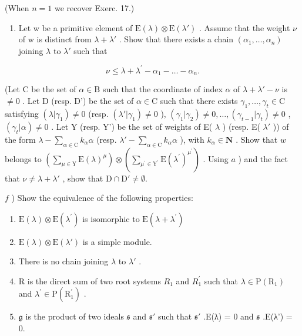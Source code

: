 (When \(n = 1\) we recover Exerc. 17.)

\begin{enumerate}
\def\labelenumi{\alph{enumi})}
\setcounter{enumi}{4}
\tightlist
\item
  Let w be a primitive element of \(\mathrm{E}(\lambda)\otimes\mathrm{E}(\lambda')\) . Assume that the weight \(\nu\) of w is distinct from \(\lambda+\lambda'\) . Show that there exists a chain \((\alpha_{1},\ldots,\alpha_{n})\) joining \(\lambda\) to \(\lambda'\) such that
\end{enumerate}

\[
\nu \leq \lambda + \lambda^ {\prime} - \alpha_ {1} - \dots - \alpha_ {n}.
\]

(Let C be the set of \(\alpha \in \mathrm{B}\) such that the coordinate of index \(\alpha\) of \(\lambda + \lambda' - \nu\) is \(\neq 0\) . Let D (resp. D') be the set of \(\alpha \in \mathrm{C}\) such that there exists \(\gamma_1, \ldots, \gamma_t \in \mathrm{C}\) satisfying \((\lambda|\gamma_1) \neq 0\) (resp. \((\lambda'|\gamma_1) \neq 0\) ), \((\gamma_1|\gamma_2) \neq 0, \ldots, (\gamma_{t-1}|\gamma_t) \neq 0\) , \((\gamma_t|\alpha) \neq 0\) . Let Y (resp. Y') be the set of weights of E( \(\lambda\) ) (resp. E( \(\lambda'\) )) of the form \(\lambda - \sum_{\alpha \in \mathrm{C}} k_\alpha\alpha\) (resp. \(\lambda' - \sum_{\alpha \in \mathrm{C}} k_\alpha\alpha\) ), with \(k_\alpha \in \mathbf{N}\) . Show that \(w\) belongs to \(\left(\sum_{\mu \in \mathrm{Y}}\mathrm{E}(\lambda)^{\mu}\right)\otimes \left(\sum_{\mu^{\prime}\in \mathrm{Y}^{\prime}}\mathrm{E}(\lambda^{\prime})^{\mu^{\prime}}\right)\) . Using \(a\) ) and the fact that \(\nu \neq \lambda +\lambda '\) , show that \(\mathrm{D}\cap \mathrm{D}'\neq \emptyset .\)

\(f\) ) Show the equivalence of the following properties:

\begin{enumerate}
\def\labelenumi{(\roman{enumi})}
\item
  \(\mathrm{E}(\lambda)\otimes \mathrm{E}(\lambda^{\prime})\) is isomorphic to \(\mathrm{E}(\lambda +\lambda^{\prime})\)
\item
  \(\mathrm{E}(\lambda) \otimes \mathrm{E}(\lambda')\) is a simple module.
\item
  There is no chain joining \(\lambda\) to \(\lambda'\) .
\item
  R is the direct sum of two root systems \(R_{1}\) and \(R_{1}^{\prime}\) such that \(\lambda \in \mathrm{P}(\mathrm{R}_{1})\) and \(\lambda^{\prime} \in \mathrm{P}(\mathrm{R}_{1}^{\prime})\) .
\item
  \(\mathfrak{g}\) is the product of two ideals \(\mathfrak{s}\) and \(\mathfrak{s}'\) such that \(\mathfrak{s}'\) .E(λ) = 0 and \(\mathfrak{s}\) .E(λ') = 0.
\end{enumerate}

